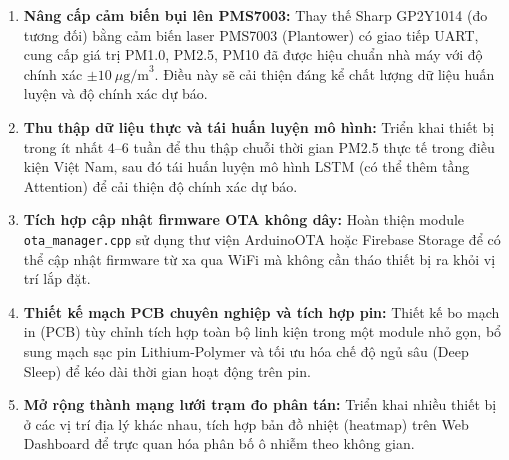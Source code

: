 \documentclass[12pt,a4paper]{article}
\begin{document}
\begin{enumerate}[label=\textbf{\arabic*.}]
    \item \textbf{Nâng cấp cảm biến bụi lên PMS7003:} Thay thế Sharp GP2Y1014 (đo tương đối) bằng cảm biến laser PMS7003 (Plantower) có giao tiếp UART, cung cấp giá trị PM1.0, PM2.5, PM10 đã được hiệu chuẩn nhà máy với độ chính xác $\pm 10~\mu\text{g/m}^3$. Điều này sẽ cải thiện đáng kể chất lượng dữ liệu huấn luyện và độ chính xác dự báo.

    \item \textbf{Thu thập dữ liệu thực và tái huấn luyện mô hình:} Triển khai thiết bị trong ít nhất $4$--$6$ tuần để thu thập chuỗi thời gian PM2.5 thực tế trong điều kiện Việt Nam, sau đó tái huấn luyện mô hình LSTM (có thể thêm tầng Attention) để cải thiện độ chính xác dự báo.

    \item \textbf{Tích hợp cập nhật firmware OTA không dây:} Hoàn thiện module \texttt{ota\_manager.cpp} sử dụng thư viện ArduinoOTA hoặc Firebase Storage để có thể cập nhật firmware từ xa qua WiFi mà không cần tháo thiết bị ra khỏi vị trí lắp đặt.

    \item \textbf{Thiết kế mạch PCB chuyên nghiệp và tích hợp pin:} Thiết kế bo mạch in (PCB) tùy chỉnh tích hợp toàn bộ linh kiện trong một module nhỏ gọn, bổ sung mạch sạc pin Lithium-Polymer và tối ưu hóa chế độ ngủ sâu (Deep Sleep) để kéo dài thời gian hoạt động trên pin.

    \item \textbf{Mở rộng thành mạng lưới trạm đo phân tán:} Triển khai nhiều thiết bị ở các vị trí địa lý khác nhau, tích hợp bản đồ nhiệt (heatmap) trên Web Dashboard để trực quan hóa phân bố ô nhiễm theo không gian.
\end{enumerate}

\newpage
\end{document}

